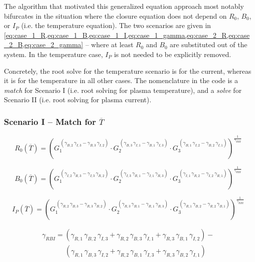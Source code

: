 The algorithm that motivated this generalized equation approach most notably bifurcates in the situation where the closure equation does not depend on $R_0$, $B_0$, or $I_P$ (i.e. the temperature equation). The two scenarios are given in \cref{eq:case_1_R,eq:case_1_B,eq:case_1_I,eq:case_1_gamma,eq:case_2_R,eq:case_2_B,eq:case_2_gamma} -- where at least $R_0$ and $B_0$ are substituted out of the system. In the temperature case, $I_P$ is not needed to be explicitly removed. 

Concretely, the root solve for the temperature  scenario is for the current, whereas it is for the temperature in all other cases. The nomenclature in the code is a \emph{match} for Scenario I (i.e. root solving for plasma temperature), and a \emph{solve} for Scenario II (i.e. root solving for plasma current).

\subsubsection{Scenario I -- Match for $\overline T$}

\begin{equation}
	\label{eq:case_1_R}
	R_0( \overline T) = \left( 
	G_1 ^ {  \, ( \gamma_{B,2} \, \gamma_{I,3} - \gamma_{B,3} \, \gamma_{I,2} ) } \cdot 
	G_2 ^ {  \, ( \gamma_{B,3} \, \gamma_{I,1} - \gamma_{B,1} \, \gamma_{I,3} ) } \cdot 
	G_3 ^ {  \, ( \gamma_{B,1} \, \gamma_{I,2} - \gamma_{B,2} \, \gamma_{I,1} ) }\right)^{ \frac{1}{\gamma_{RBI}} }
\end{equation}

\begin{equation}
	\label{eq:case_1_B}
	B_0( \overline T) = \left( 
	G_1 ^ {  \, ( \gamma_{I,2} \, \gamma_{R,3} - \gamma_{I,3} \, \gamma_{R,2} ) } \cdot 
	G_2 ^ {  \, ( \gamma_{I,3} \, \gamma_{R,1} - \gamma_{I,1} \, \gamma_{R,3} ) } \cdot 
	G_3 ^ {  \, ( \gamma_{I,1} \, \gamma_{R,2} - \gamma_{I,2} \, \gamma_{R,1} ) }\right)^{ \frac{1}{\gamma_{RBI}} }
\end{equation}

\begin{equation}
	\label{eq:case_1_I}
	I_P( \overline T) = \left( 
	G_1 ^ {  \, ( \gamma_{R,2} \, \gamma_{B,3} - \gamma_{R,3} \, \gamma_{B,2} ) } \cdot 
	G_2 ^ {  \, ( \gamma_{R,3} \, \gamma_{B,1} - \gamma_{R,1} \, \gamma_{B,3} ) } \cdot 
	G_3 ^ {  \, ( \gamma_{R,1} \, \gamma_{B,2} - \gamma_{R,2} \, \gamma_{B,1} ) }\right)^{ \frac{1}{\gamma_{RBI}} }
\end{equation}

\begin{gather}
	\label{eq:case_1_gamma}
	\gamma_{RBI} = ( \gamma_{R,1} \, \gamma_{B,2} \, \gamma_{I,3} +  \gamma_{R,2} \, \gamma_{B,3} \, \gamma_{I,1} + \gamma_{R,3} \, \gamma_{B,1} \, \gamma_{I,2} ) - \\
	\ \ \ \ \ \ \ \ \ \ \ \ \ \ \ ( \gamma_{R,1} \, \gamma_{B,3} \, \gamma_{I,2} +  \gamma_{R,2} \, \gamma_{B,1} \, \gamma_{I,3} + \gamma_{R,3} \, \gamma_{B,2} \, \gamma_{I,1} ) \nonumber
\end{gather}

